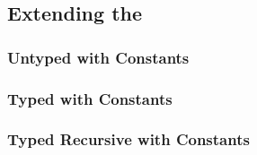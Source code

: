 \subsection{Extending the \LambdaCalc}

\subsubsection{Untyped \LambdaCalc with Constants}

\subsubsection{Typed \LambdaCalc with Constants}

\subsubsection{Typed Recursive \LambdaCalc with Constants}
